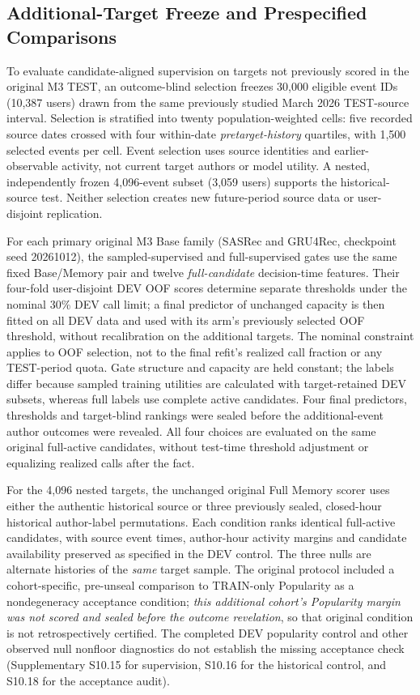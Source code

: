 \subsection{Additional-Target Freeze and Prespecified Comparisons}

To evaluate candidate-aligned supervision on targets not previously scored in the original M3 TEST, an outcome-blind selection freezes 30,000 eligible event IDs (10,387 users) drawn from the same previously studied March 2026 TEST-source interval. Selection is stratified into twenty population-weighted cells: five recorded source dates crossed with four within-date \emph{pretarget-history} quartiles, with 1,500 selected events per cell. Event selection uses source identities and earlier-observable activity, not current target authors or model utility. A nested, independently frozen 4,096-event subset (3,059 users) supports the historical-source test. Neither selection creates new future-period source data or user-disjoint replication.

For each primary original M3 Base family (SASRec and GRU4Rec, checkpoint seed 20261012), the sampled-supervised and full-supervised gates use the same fixed Base/Memory pair and twelve \emph{full-candidate} decision-time features. Their four-fold user-disjoint DEV OOF scores determine separate thresholds under the nominal 30\% DEV call limit; a final predictor of unchanged capacity is then fitted on all DEV data and used with its arm's previously selected OOF threshold, without recalibration on the additional targets. The nominal constraint applies to OOF selection, not to the final refit's realized call fraction or any TEST-period quota. Gate structure and capacity are held constant; the labels differ because sampled training utilities are calculated with target-retained DEV subsets, whereas full labels use complete active candidates. Four final predictors, thresholds and target-blind rankings were sealed before the additional-event author outcomes were revealed. All four choices are evaluated on the same original full-active candidates, without test-time threshold adjustment or equalizing realized calls after the fact.

For the 4,096 nested targets, the unchanged original Full Memory scorer uses either the authentic historical source or three previously sealed, closed-hour historical author-label permutations. Each condition ranks identical full-active candidates, with source event times, author-hour activity margins and candidate availability preserved as specified in the DEV control. The three nulls are alternate histories of the \emph{same} target sample. The original protocol included a cohort-specific, pre-unseal comparison to TRAIN-only Popularity as a nondegeneracy acceptance condition; \emph{this additional cohort's Popularity margin was not scored and sealed before the outcome revelation}, so that original condition is not retrospectively certified. The completed DEV popularity control and other observed null nonfloor diagnostics do not establish the missing acceptance check (Supplementary S10.15 for supervision, S10.16 for the historical control, and S10.18 for the acceptance audit).

